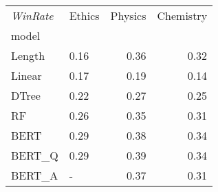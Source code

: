 \begin{tabular}{llrr}
\toprule
\textit{WinRate} & Ethics &  Physics &  Chemistry \\
model  &        &          &            \\
\midrule
Length &   0.16 &     0.36 &       0.32 \\
Linear &   0.17 &     0.19 &       0.14 \\
DTree  &   0.22 &     0.27 &       0.25 \\
RF     &   0.26 &     0.35 &       0.31 \\
BERT   &   0.29 &     0.38 &       0.34 \\
BERT\_Q &   0.29 &     0.39 &       0.34 \\
BERT\_A &      - &     0.37 &       0.31 \\
\bottomrule
\end{tabular}
